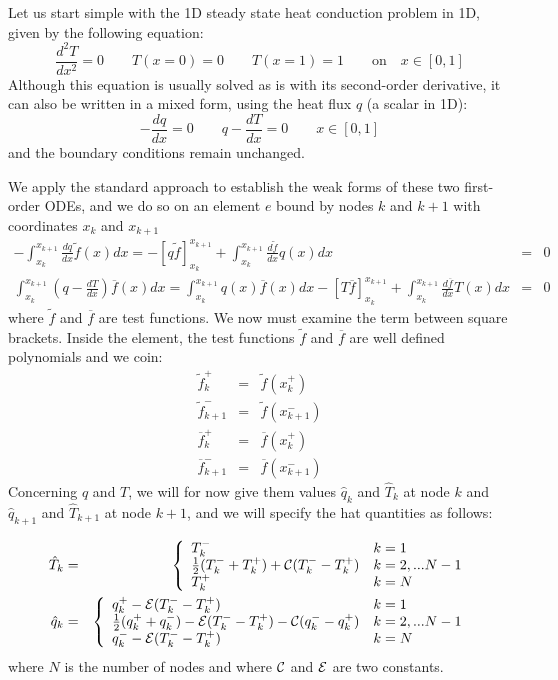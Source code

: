 Let us start simple with the 1D steady state heat conduction problem in 1D, given by the following 
equation:
\begin{equation}
\frac{d^2T}{dx^2}=0 \qquad T(x=0)=0 \qquad T(x=1)=1 \qquad \text{on} \quad x\in[0,1]
\end{equation}
Although this equation is usually solved as is with its second-order derivative, it can also 
be written in a mixed form, using the heat flux $q$ (a scalar in 1D):
\[
-\frac{dq}{dx}=0 \qquad q-\frac{dT}{dx}=0 \qquad x\in[0,1]
\]
and the boundary conditions remain unchanged. 

We apply the standard approach to establish the weak forms of these two first-order ODEs, and we do so 
on an element $e$ bound by nodes $k$ and $k+1$ with coordinates $x_k$ and $x_{k+1}$
\begin{eqnarray}
-\int_{x_k}^{x_{k+1}} \frac{dq}{dx} \tilde{f}(x) dx = -\left[q \tilde{f} \right]_{x_k}^{x_{k+1}} 
+ \int_{x_k}^{x_{k+1}} \frac{d\tilde{f}}{dx} q(x) dx &=& 0
\label{eq:dg1}\\
\int_{x_k}^{x_{k+1}}  \left( q-\frac{dT}{dx} \right) \overline{f}(x) dx
=
\int_{x_k}^{x_{k+1}}  q(x) \overline{f}(x) dx
-\left[ T \overline{f}  \right]_{x_k}^{x_{k+1}} + \int_{x_k}^{x_{k+1}} \frac{d\overline{f}}{dx} T(x) dx 
&=& 0
\label{eq:dg2}
\end{eqnarray}
where $\tilde{f}$ and $\overline{f}$ are test functions.
We now must examine the term between square brackets. 
Inside the element, the test functions $\tilde{f}$ and $\overline{f}$ are well defined polynomials
and we coin:
\begin{eqnarray}
\tilde{f}_k^+&=&\tilde{f}(x_k^+)\\
\tilde{f}_{k+1}^-&=&\tilde{f}(x_{k+1}^-)\\
\overline{f}_k^+&=&\overline{f}(x_k^+)\\
\overline{f}_{k+1}^-&=&\overline{f}(x_{k+1}^-)
\end{eqnarray}
Concerning $q$ and $T$, we will for now  give them values $\hat{q}_k$ and $\hat{T}_k$ at node $k$
and $\hat{q}_{k+1}$ and $\hat{T}_{k+1}$ at node $k+1$, and we will specify the hat quantities as follows:

\begin{eqnarray}
\hat{T}_k &=&
\left\{
\begin{array}{ll}
T_k^-   & k=1 \\ 
\frac{1}{2}(T_k^-+T_k^+) + {\cal C} (T_k^- - T_k^+) & k=2,...N-1\\
T_k^+    & k=N \\ 
\end{array}
\right. \nonumber\\
\hat{q}_k &=&
\left\{
\begin{array}{ll}
q_k^+ -{\cal E} (T_k^--T_k^+)  & k=1 \\ 
\frac{1}{2}(q_k^+ + q_k^-) - {\cal E} (T_k^- - T_k^+) - {\cal C}(q_k^- - q_k^+) & k=2,...N-1\\
q_k^- -{\cal E} (T_k^--T_k^+)    & k=N \\ 
\end{array}
\right.
\end{eqnarray}
where $N$ is the number of nodes and where ${\cal C}$ and ${\cal E}$ are two constants. 


